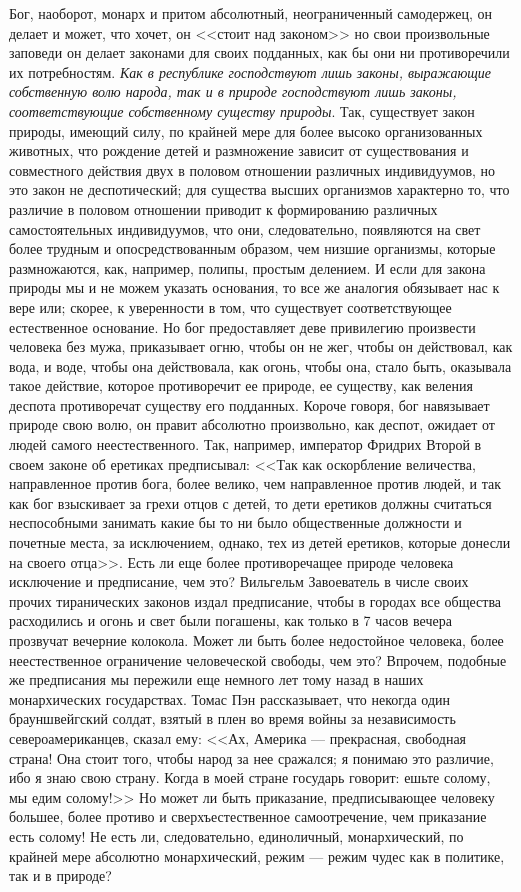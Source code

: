\documentclass[12pt]{article}
\begin{document}
Бог, наоборот, монарх и притом абсолютный, неограниченный самодержец, он делает и может, что хочет, он <<стоит над законом>>  но свои произвольные заповеди он делает законами для своих подданных, как бы они ни противоречили их потребностям. \emph{Как в республике господствуют лишь законы, выражающие собственную волю народа, так и в природе господствуют лишь законы, соответствующие собственному существу природы}. Так, существует закон природы, имеющий силу, по крайней мере для более высоко организованных животных, что рождение детей и размножение зависит от существования и совместного действия двух в половом отношении различных индивидуумов, но это закон не деспотический; для существа высших организмов характерно то, что различие в половом отношении приводит к формированию различных самостоятельных индивидуумов, что они, следовательно, появляются на свет более трудным и опосредствованным образом, чем низшие организмы, которые размножаются, как, например, полипы, простым делением. И если для закона природы мы и не можем указать основания, то все же аналогия обязывает нас к вере или; скорее, к уверенности в том, что существует соответствующее естественное основание. Но бог предоставляет деве привилегию произвести человека без мужа, приказывает огню, чтобы он не жег, чтобы он действовал, как вода, и воде, чтобы она действовала, как огонь, чтобы она, стало быть, оказывала такое действие, которое противоречит ее природе, ее существу, как веления деспота противоречат существу его подданных. Короче говоря, бог навязывает природе свою волю, он правит абсолютно произвольно, как деспот, ожидает от людей самого неестественного. Так, например, император Фридрих Второй в своем законе об еретиках предписывал: <<Так как оскорбление величества, направленное против бога, более велико, чем направленное против людей, и так как бог взыскивает за грехи отцов с детей, то дети еретиков должны считаться неспособными занимать какие бы то ни было общественные должности и почетные места, за исключением, однако, тех из детей еретиков, которые донесли на своего отца>>. Есть ли еще более противоречащее природе человека исключение и предписание, чем это? Вильгельм Завоеватель в числе своих прочих тиранических законов издал предписание, чтобы в городах все общества расходились и огонь и свет были погашены, как только в 7 часов вечера прозвучат вечерние колокола. Может ли быть более недостойное человека, более неестественное ограничение человеческой свободы, чем это? Впрочем, подобные же предписания мы пережили еще немного лет тому назад в наших монархических государствах. Томас Пэн рассказывает, что некогда один брауншвейгский солдат, взятый в плен во время войны за независимость североамериканцев, сказал ему: <<Ах, Америка --- прекрасная, свободная страна! Она стоит того, чтобы народ за нее сражался; я понимаю это различие, ибо я знаю свою страну. Когда в моей стране государь говорит: ешьте солому, мы едим солому!>> Но может ли быть приказание, предписывающее человеку большее, более противо и сверхъестественное самоотречение, чем приказание есть солому! Не есть ли, следовательно, единоличный, монархический, по крайней мере абсолютно монархический, режим --- режим чудес как в политике, так и в природе? 
\end{document}
